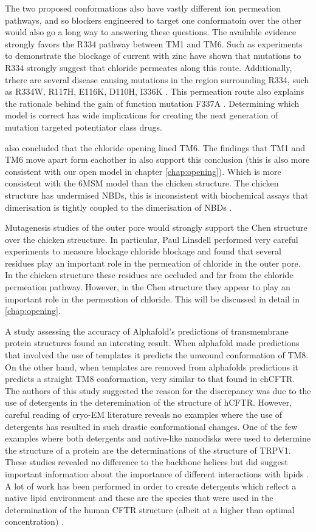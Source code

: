 The two proposed conformations also have vastly different ion permeation pathways, and so blockers engineered to target one conformatoin over the other would also go a long way to answering these questions. The available evidence strongly favors the R334 pathway between TM1 and TM6. Such as experiments to  demonstrate the blockage of current with zinc have shown that mutations to R334 strongly suggest that chloride permeates along this route. Additionally, trhere are several disease causing mutations in the region surrounding R334, such as R334W, R117H, E116K, D110H, I336K \cite{cftr2}. This permeation route also explains the rationale behind the gain of function mutation F337A \cite{}. Determining which model is correct has wide implications for creating the next generation of mutation targeted potentiator class drugs.

\cite{gao2015} also concluded that the chloride opening lined TM6. The findings that TM1 and TM6 move apart form eachother in \cite{negoda2018} also support this conclusion (this is also more consistent with our open model in chapter \ref{chap:opening}). Which is more consistent with the 6MSM model than the chicken structure.
The chicken structure has undermised NBDs, this is inconsistent with biochemical assays that dimerisation is tightly coupled to the dimerisation of NBDs \cite{vergani2005, yeh2021}.

Mutagenesis studies of the outer pore would strongly support the Chen structure over the chicken streucture. In particular, Paul Linsdell performed very careful experiments to measure blockage chloride blockage and found that several residues play an important role in the permeation of chloride in the outer pore. In the chicken structure these residues are occluded and far from the chloride permeation pathway. However, in the Chen structure they appear to play an important role in the permeation of chloride. This will be discussed in detail in \ref{chap:opening}.

A study assessing the accuracy of Alphafold's predictions of transmembrane protein structures found an intersting result. When alphafold made predictions that involved the use of templates it predicts the unwound conformation of TM8. On the other hand, when templates are removed from alphafolds predictions it predicts a straight TM8 conformation, very similar to that found in chCFTR. The authors of this study suggested the reason for the discrepancy was due to the use of detergents in the deteremination of the structure of hCFTR. However, careful reading of cryo-EM literature reveals no examples where the use of detergents has resulted in such drastic conformational changes. One of the few examples where both detergents and native-like nanodisks were used to determine the structure of a protein are the determinations of the structure of TRPV1. These studies revealed no difference to the backbone helices but did suggest important information about the importance of different interactions with lipids \cite{gao2016}. A lot of work has been performed in order to create detergents which reflect a native lipid environment and these are the species that were used in the determination of the human CFTR structure (albeit at a higher than optimal concentration) \cite{gao2016, zhang2018, kampjut2021}. 


